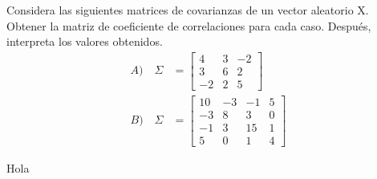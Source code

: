 \begin{problem}{1}
Considera las siguientes matrices de covarianzas de un vector aleatorio X. Obtener la matriz de coeficiente de correlaciones para cada caso. Después, interpreta los valores obtenidos.
\begin{align*}
A) \quad \Sigma &=
\begin{bmatrix}
4&3&-2\\
3&6&2\\
-2&2&5
\end{bmatrix}\\
B) \quad \Sigma &=
\begin{bmatrix}
10&-3&-1&5\\
-3&8&3&0\\
-1&3&15&1\\
5&0&1&4
\end{bmatrix}
\end{align*}

\end{problem}
\begin{sol}
Hola
\end{sol}